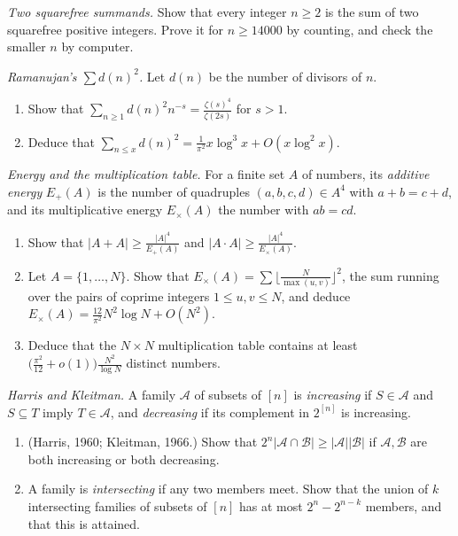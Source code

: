 \begin{exercise}[$\star\star\star$]\label{pb:twosqfree}
\emph{Two squarefree summands.} Show that every integer $n\ge2$ is the sum of two squarefree positive integers. Prove it for
$n\ge14000$ by counting, and check the smaller $n$ by computer.
\end{exercise}

\begin{exercise}[$\star\star$]\label{pb:dsquared}
\emph{Ramanujan's $\sum d(n)^2$.} Let $d(n)$ be the number of divisors of $n$.
\begin{enumerate}[label=(\alph*)]
\item Show that $\sum_{n\ge1}d(n)^2n^{-s}=\frac{\zeta(s)^4}{\zeta(2s)}$ for $s>1$.
\item Deduce that $\sum_{n\le x}d(n)^2=\frac1{\pi^2}x\log^3x+O(x\log^2x)$.
\end{enumerate}
\end{exercise}

\begin{exercise}[$\star\star$]\label{pb:energy}
\emph{Energy and the multiplication table.} For a finite set $A$ of numbers, its \emph{additive energy} $E_+(A)$ is the number of
quadruples $(a,b,c,d)\in A^4$ with $a+b=c+d$, and its multiplicative energy $E_\times(A)$ the number with $ab=cd$.
\begin{enumerate}[label=(\alph*)]
\item Show that $|A+A|\ge\frac{|A|^4}{E_+(A)}$ and $|A\cdot A|\ge\frac{|A|^4}{E_\times(A)}$.
\item Let $A=\{1,\dots,N\}$. Show that $E_\times(A)=\sum\bigl\lfloor\frac N{\max(u,v)}\bigr\rfloor^2$, the sum running over the pairs of coprime
integers $1\le u,v\le N$, and deduce $E_\times(A)=\frac{12}{\pi^2}N^2\log N+O(N^2)$.
\item Deduce that the $N\times N$ multiplication table contains at least $\bigl(\frac{\pi^2}{12}+o(1)\bigr)\frac{N^2}{\log N}$ distinct numbers.
\end{enumerate}
\end{exercise}

\begin{exercise}[$\star\star$]\label{pb:kleitman}
\emph{Harris and Kleitman.} A family $\mathcal A$ of subsets of $[n]$ is \emph{increasing} if $S\in\mathcal A$ and $S\subseteq T$ imply $T\in\mathcal A$,
and \emph{decreasing} if its complement in $2^{[n]}$ is increasing.
\begin{enumerate}[label=(\alph*)]
\item (Harris, 1960; Kleitman, 1966.) Show that $2^n|\mathcal A\cap\mathcal B|\ge|\mathcal A||\mathcal B|$ if $\mathcal A,\mathcal B$ are both increasing or both decreasing.
\item A family is \emph{intersecting} if any two members meet. Show that the union of $k$ intersecting families of subsets of $[n]$ has
at most $2^n-2^{n-k}$ members, and that this is attained.
\end{enumerate}
\end{exercise}


